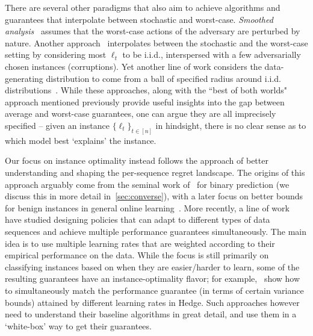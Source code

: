There are several other paradigms that also aim to achieve algorithms and guarantees that interpolate between stochastic and worst-case. \emph{Smoothed analysis}~\citep{Rakhlin--Sridharan--Tewari2011, Haghtalab--Roughgarden--Shetty2022, Bhatt--Haghtalab--Shetty2023, Block--Dagan--Golowich--Rakhlin2022} assumes that the worst-case actions of the adversary are perturbed by nature. Another approach~\citep{bubeck2012best,Lykouris--Mirrokni--PaesLeme2018, Amir--Attias--Koren--Mansour--Livni2020, Zimmert--Seldin2019} interpolates between the stochastic and the worst-case setting by considering most $\ell_t$ to be i.i.d., interspersed with a few adversarially chosen instances (corruptions). Yet another line of work considers the data-generating distribution to come from a ball of specified radius around i.i.d. distributions~\citep{mourtada2019optimality, bilodeau2023relaxing}. While these approaches, along with the ``best of both worlds" approach mentioned previously provide useful insights into the gap between average and worst-case guarantees, one can argue they are all imprecisely specified -- given an instance $\{\ell_t\}_{t\in[n]}$ in hindsight, there is no clear sense as to which model best `explains' the instance.

Our focus on instance optimality instead follows the approach of better understanding and shaping the per-sequence regret landscape. The origins of this approach arguably come from the seminal work of~\cite{Cover1966} for binary prediction (we discuss this in more detail in~\cref{sec:converse}), with a later focus on better bounds for benign instances in general online learning~\citep{Auer--Cesa-Bianchi--Gentile2002,cesa2005minimizing,hazan2010extracting}. More recently, 
a line of work~\citep{Koolen--VanErven--Grunwald2014LLR, VanErven--Grunwald--Mehta--Reid--Williamson2015FastRates, VanErven--Koolen2016Metagrad, gaillard2014second} have studied designing policies that can adapt to different types of data sequences and achieve multiple performance guarantees simultaneously. The main idea is to use multiple learning rates that are weighted according to their empirical performance on the data. While the focus is still primarily on classifying instances based on when they are easier/harder to learn, some of the resulting guarantees have an instance-optimality flavor; for example,~\cite{VanErven--Koolen2016Metagrad} show how to simultaneously match the performance guarantee (in terms of certain variance bounds) attained by different learning rates in Hedge. Such approaches however need to understand their baseline algorithms in great detail, and use them in a `white-box' way to get their guarantees. 

